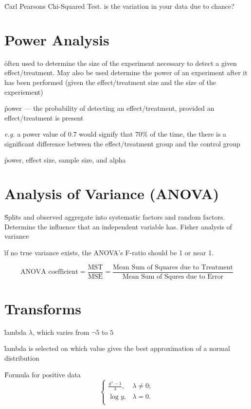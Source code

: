 \r{Carl Pearsons Chi-Squared Test. is the variation in your data due to chance?}


\section{Power Analysis}

\r{often used to determine the size of the experiment necessary to detect a given effect/treatment. May also be used determine the power of an experiment after it has been performed (given the effect/treatment size and the size of the experiement)}

\r{power --- the probability of detecting an effect/treatment, provided an effect/treatment is present}

\r{\textit{e.g.} a power value of $0.7$ would signify that $70\%$ of the time, the there is a significant difference between the effect/treatment group and the control group}

\r{power, effect size, sample size, and alpha}


\section{Analysis of Variance (ANOVA)}

\r{Splits and observed aggregate into systematic factors and random factors. Determine the influence that an independent variable has. Fisher analysis of variance\cite{fisher1992statistical}}

\r{if no true variance exists, the ANOVA's F-ratio should be 1 or near 1.}

\begin{equation}
	{\textrm{ANOVA coefficient} = \frac{ \textrm{MST}}{\textrm{MSE}} = \frac{  \textrm{Mean Sum of Squares due to Treatment}}{ 
			 \textrm{Mean Sum of Squres due to Error}}}
	\label{eq:anova}
\end{equation}


\section{Transforms}


\r{lambda $\lambda$, which varies from $\neg5$ to $5$}

\r{lambda is selected on which value gives the best approximation of a normal distribution}


\r{Formula for positive data}
\begin{equation}
	\begin{cases} 
		\frac
		{y^\lambda - 1}
		{\lambda},  & \lambda \neq 0; \\
	    \log y, & \lambda = 0. \\
	\end{cases}
\end{equation}



